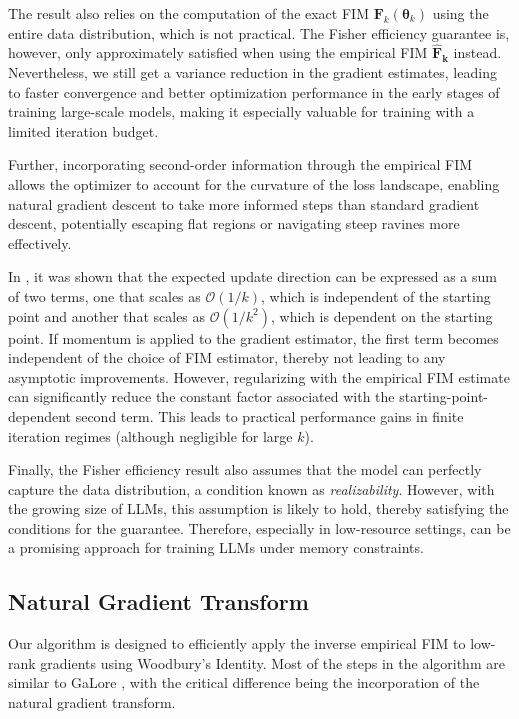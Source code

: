 The result also relies on the computation of the exact FIM \( \mathbf{F}_{k}(\mathbf{\theta}_{k}) \) using the entire data distribution, which is not practical. The Fisher efficiency guarantee is, however, only approximately satisfied when using the empirical FIM \(\mathbf{\hat{F}_{k}}\) instead. Nevertheless, we still get a variance reduction in the gradient estimates, leading to faster convergence and better optimization performance in the early stages of training large-scale models, making it especially valuable for training with a limited iteration budget.

Further, incorporating second-order information through the empirical FIM allows the optimizer to account for the curvature of the loss landscape, enabling natural gradient descent to take more informed steps than standard gradient descent, potentially escaping flat regions or navigating steep ravines more effectively.

In \citep{martens2020new}, it was shown that the expected update direction can be expressed as a sum of two terms, one that scales as \(\mathcal{O}(1/k)\), which is independent of the starting point and another that scales as \(\mathcal{O}(1/k^2)\), which is dependent on the starting point. If momentum is applied to the gradient estimator, the first term becomes independent of the choice of FIM estimator, thereby not leading to any asymptotic improvements. However, regularizing with the empirical FIM estimate can significantly reduce the constant factor associated with the starting-point-dependent second term. This leads to practical performance gains in finite iteration regimes (although negligible for large \(k\)).

Finally, the Fisher efficiency result also assumes that the model can perfectly capture the data distribution, a condition known as \emph{realizability}. However, with the growing size of LLMs, this assumption is likely to hold, thereby satisfying the conditions for the guarantee. Therefore, especially in low-resource settings, \textit{\lowrank} can be a promising approach for training LLMs under memory constraints.

\subsection{Natural Gradient Transform}

Our \textit{\lowrank} algorithm is designed to efficiently apply the inverse empirical FIM to low-rank gradients using Woodbury's Identity. Most of the steps in the algorithm are similar to GaLore \citep{zhao2024galore}, with the critical difference being the incorporation of the natural gradient transform.

